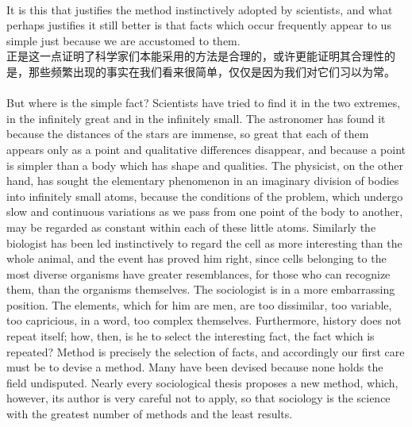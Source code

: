 \documentclass{article}
\begin{document}
\\
It is this that justifies the method instinctively adopted by scientists, and what perhaps justifies it still better is that facts which occur frequently appear to us simple just because we are accustomed to them.\\
正是这一点证明了科学家们本能采用的方法是合理的，或许更能证明其合理性的是，那些频繁出现的事实在我们看来很简单，仅仅是因为我们对它们习以为常。 \\

\\
But where is the simple fact? Scientists have tried to find it in the two extremes, in the infinitely great and in the infinitely small. The astronomer has found it because the distances of the stars are immense, so great that each of them appears only as a point and qualitative differences disappear, and because a point is simpler than a body which has shape and qualities. The physicist, on the other hand, has sought the elementary phenomenon in an imaginary division of bodies into infinitely small atoms, because the conditions of the problem, which undergo slow and continuous variations as we pass from one point of the body to another, may be regarded as constant within each of these little atoms. Similarly the biologist has been led instinctively to regard the cell as more interesting than the whole animal, and the event has proved him right, since cells belonging to the most diverse organisms have greater resemblances, for those who can recognize them, than the organisms themselves. The sociologist is in a more embarrassing position. The elements, which for him are men, are too dissimilar, too variable, too capricious, in a word, too complex themselves. Furthermore, history does not repeat itself; how, then, is he to select the interesting fact, the fact which is repeated? Method is precisely the selection of facts, and accordingly our first care must be to devise a method. Many have been devised because none holds the field undisputed. Nearly every sociological thesis proposes a new method, which, however, its author is very careful not to apply, so that sociology is the science with the greatest number of methods and the least results.\\
\end{document}
